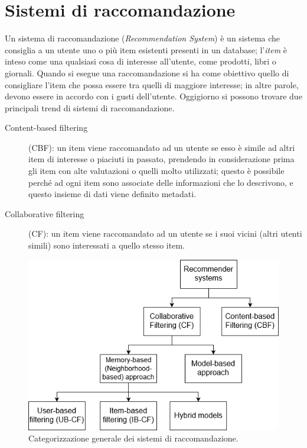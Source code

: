 \section{Sistemi di raccomandazione}
Un sistema di raccomandazione (\textit{Recommendation System}) è un sistema che consiglia a un utente uno o più item esistenti 
presenti in un database; l'\textit{item} è inteso come una qualsiasi cosa di interesse all'utente, come prodotti, libri o giornali. 
Quando si esegue una raccomandazione si ha come obiettivo quello di consigliare l'item che possa essere tra quelli di maggiore 
interesse; in altre parole, devono essere in accordo con i gusti dell'utente.\hfill\break
Oggigiorno si possono trovare due principali trend di sistemi di raccomandazione.
\begin{description}
    \item[Content-based filtering](CBF): un item viene raccomandato ad un utente se esso è simile ad altri item di interesse o piaciuti 
    in passato, prendendo in considerazione prima gli item con alte valutazioni o quelli molto utilizzati; questo è possibile perché ad 
    ogni item sono associate delle informazioni che lo descrivono, e questo insieme di dati viene definito metadati.
    \item[Collaborative filtering](CF): un item viene raccomandato ad un utente se i suoi vicini (altri utenti simili) sono 
    interessati a quello stesso item.
\end{description}
%
\begin{figure}[ht!]
    \centering
    \includegraphics[scale=0.5]{images/recommender_systems.png}
    \caption{Categorizzazione generale dei sistemi di raccomandazione.}
    \label{fig:recommender_systems}
\end{figure}
